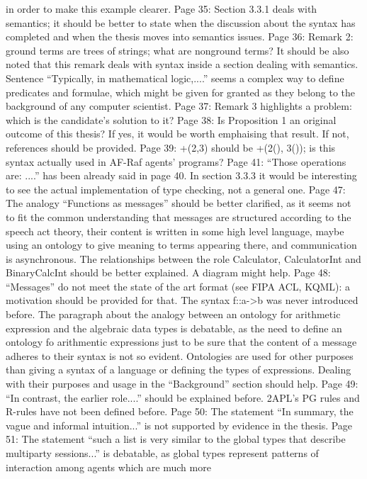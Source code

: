 \documentclass{article}
\newenvironment{them}{\noindent\begingroup\color{blue}}{\endgroup\par}
\begin{document}
\begin{them}
in order to make this example clearer.
Page 35:
Section 3.3.1 deals with semantics; it should be better to state when the discussion about the syntax
has completed and when the thesis moves into semantics issues.
Page 36:
Remark 2: ground terms are trees of strings; what are nonground terms? It should be also noted that
this remark deals with syntax inside a section dealing with semantics.
Sentence “Typically, in mathematical logic,....” seems a complex way to define predicates and
formulae, which might be given for granted as they belong to the background of any computer
scientist.
Page 37:
Remark 3 highlights a problem: which is the candidate's solution to it?
Page 38:
Is Proposition 1 an original outcome of this thesis? If yes, it would be worth emphaising that result. If
not, references should be provided.
Page 39:
+(2,3) should be +(2(), 3()); is this syntax actually used in AF-Raf agents' programs?
Page 41:
“Those operations are: ....” has been already said in page 40.
In section 3.3.3 it would be interesting to see the actual implementation of type checking, not a
general one.
Page 47:
The analogy “Functions as messages” should be better clarified, as it seems not to fit the common
understanding that messages are structured according to the speech act theory, their content is
written in some high level language, maybe using an ontology to give meaning to terms appearing
there, and communication is asynchronous.
The relationships between the role Calculator, CalculatorInt and BinaryCalcInt should be better
explained. A diagram might help.
Page 48:
“Messages” do not meet the state of the art format (see FIPA ACL, KQML): a motivation should be
provided for that.
The syntax f::a->b was never introduced before.
The paragraph about the analogy between an ontology for arithmetic expression and the algebraic
data types is debatable, as the need to define an ontology fo arithmentic expressions just to be sure
that the content of a message adheres to their syntax is not so evident. Ontologies are used for other
purposes than giving a syntax of a language or defining the types of expressions. Dealing with their
purposes and usage in the “Background” section should help.
Page 49:
“In contrast, the earlier role....” should be explained before.
2APL's PG rules and R-rules have not been defined before.
Page 50:
The statement “In summary, the vague and informal intuition...” is not supported by evidence in the
thesis.
Page 51:
The statement “such a list is very similar to the global types that describe multiparty sessions...” is
debatable, as global types represent patterns of interaction among agents which are much more

\end{them}
\end{document}
